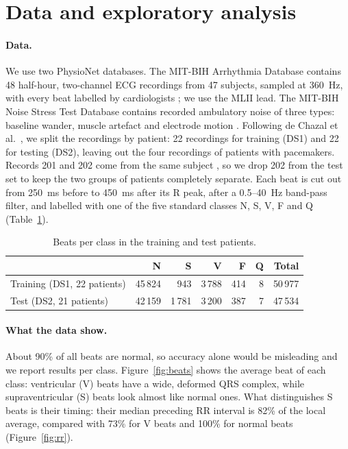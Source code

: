 \section{Data and exploratory analysis}
\label{section:data}

\paragraph{Data.} We use two PhysioNet databases. The MIT-BIH Arrhythmia Database contains 48 half-hour, two-channel ECG recordings from 47 subjects, sampled at 360~Hz, with every beat labelled by cardiologists \cite{moody2001impact}; we use the MLII lead. The MIT-BIH Noise Stress Test Database contains recorded ambulatory noise of three types: baseline wander, muscle artefact and electrode motion \cite{moody1984noise}. Following de Chazal et al.~\cite{dechazal2004automatic}, we split the recordings by patient: 22 recordings for training (DS1) and 22 for testing (DS2), leaving out the four recordings of patients with pacemakers. Records 201 and 202 come from the same subject \cite{moody2001impact}, so we drop 202 from the test set to keep the two groups of patients completely separate. Each beat is cut out from 250~ms before to 450~ms after its R peak, after a 0.5--40~Hz band-pass filter, and labelled with one of the five standard classes N, S, V, F and Q (Table~\ref{tab:classes}).

\begin{table}[H]
\caption{Beats per class in the training and test patients.}
\label{tab:classes}
\centering
\small
{}
\begin{tabular}{@{}lrrrrrr@{}}
\toprule
 & \textbf{N} & \textbf{S} & \textbf{V} & \textbf{F} & \textbf{Q} & \textbf{Total} \\
\midrule
Training (DS1, 22 patients) & 45\,824 & 943 & 3\,788 & 414 & 8 & 50\,977 \\
Test (DS2, 21 patients) & 42\,159 & 1\,781 & 3\,200 & 387 & 7 & 47\,534 \\
\bottomrule
\end{tabular}
\end{table}

\paragraph{What the data show.} About 90\% of all beats are normal, so accuracy alone would be misleading and we report results per class. Figure~\ref{fig:beats} shows the average beat of each class: ventricular (V) beats have a wide, deformed QRS complex, while supraventricular (S) beats look almost like normal ones. What distinguishes S beats is their timing: their median preceding RR interval is 82\% of the local average, compared with 73\% for V beats and 100\% for normal beats (Figure~\ref{fig:rr}).

